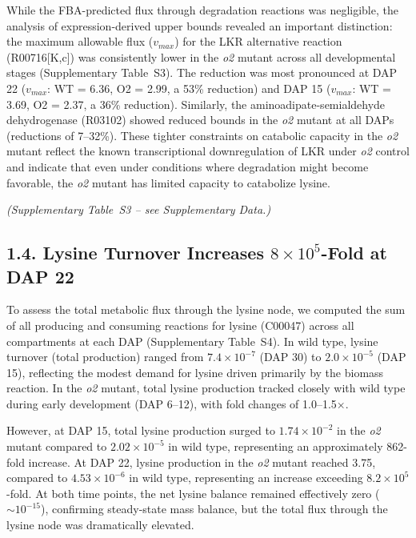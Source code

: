 \documentclass[12pt,a4paper]{article}
\begin{document}
While the FBA-predicted flux through degradation reactions was negligible, the analysis of expression-derived upper bounds revealed an important distinction: the maximum allowable flux ($v_{max}$) for the LKR alternative reaction (R00716[K,c]) was consistently lower in the \textit{o2} mutant across all developmental stages (Supplementary Table~S3). The reduction was most pronounced at DAP 22 ($v_{max}$: WT = 6.36, O2 = 2.99, a 53\% reduction) and DAP 15 ($v_{max}$: WT = 3.69, O2 = 2.37, a 36\% reduction). Similarly, the aminoadipate-semialdehyde dehydrogenase (R03102) showed reduced bounds in the \textit{o2} mutant at all DAPs (reductions of 7--32\%). These tighter constraints on catabolic capacity in the \textit{o2} mutant reflect the known transcriptional downregulation of LKR under \textit{o2} control \citep{Kemper1999, Arruda2000} and indicate that even under conditions where degradation might become favorable, the \textit{o2} mutant has limited capacity to catabolize lysine.


\noindent\textit{(Supplementary Table~S3 -- see Supplementary Data.)}


\subsection{1.4. Lysine Turnover Increases $8 \times 10^{5}$-Fold at DAP 22}

To assess the total metabolic flux through the lysine node, we computed the sum of all producing and consuming reactions for lysine (C00047) across all compartments at each DAP (Supplementary Table~S4). In wild type, lysine turnover (total production) ranged from $7.4 \times 10^{-7}$ (DAP 30) to $2.0 \times 10^{-5}$ (DAP 15), reflecting the modest demand for lysine driven primarily by the biomass reaction. In the \textit{o2} mutant, total lysine production tracked closely with wild type during early development (DAP 6--12), with fold changes of 1.0--1.5$\times$.

However, at DAP 15, total lysine production surged to $1.74 \times 10^{-2}$ in the \textit{o2} mutant compared to $2.02 \times 10^{-5}$ in wild type, representing an approximately 862-fold increase. At DAP 22, lysine production in the \textit{o2} mutant reached 3.75, compared to $4.53 \times 10^{-6}$ in wild type, representing an increase exceeding $8.2 \times 10^{5}$-fold. At both time points, the net lysine balance remained effectively zero ($\sim 10^{-15}$), confirming steady-state mass balance, but the total flux through the lysine node was dramatically elevated.
\end{document}
